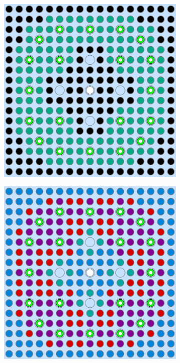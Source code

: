 \begin{figure}[h!]
\begin{subfigure}{0.48\textwidth}
  \includegraphics[width=0.9\linewidth]{figures/unsupervised/geometries/with-features/2-clusters/combined/assm-31-20BPs}
  \caption{}
  \label{fig:chap10-assm-31-20BPs-combined-2}
\end{subfigure}
\begin{subfigure}{0.48\textwidth}
  \centering
  \includegraphics[width=0.9\linewidth]{figures/unsupervised/geometries/with-features/4-clusters/pinch/assm-31-20BPs}

\end{subfigure}
\end{figure}
